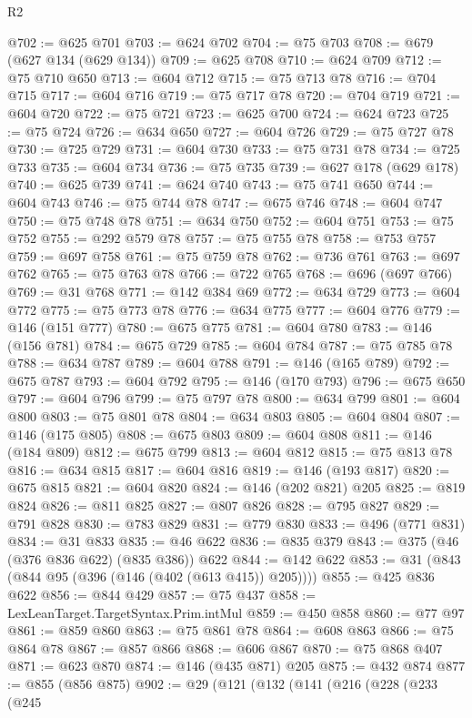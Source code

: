 \begin{lexlean}{R2}
\begin{coremodule}
@702 := @625 @701
@703 := @624 @702
@704 := @75 @703
@708 := @679 (@627 @134 (@629 @134))
@709 := @625 @708
@710 := @624 @709
@712 := @75 @710 @650
@713 := @604 @712
@715 := @75 @713 @78
@716 := @704 @715
@717 := @604 @716
@719 := @75 @717 @78
@720 := @704 @719
@721 := @604 @720
@722 := @75 @721
@723 := @625 @700
@724 := @624 @723
@725 := @75 @724
@726 := @634 @650
@727 := @604 @726
@729 := @75 @727 @78
@730 := @725 @729
@731 := @604 @730
@733 := @75 @731 @78
@734 := @725 @733
@735 := @604 @734
@736 := @75 @735
@739 := @627 @178 (@629 @178)
@740 := @625 @739
@741 := @624 @740
@743 := @75 @741 @650
@744 := @604 @743
@746 := @75 @744 @78
@747 := @675 @746
@748 := @604 @747
@750 := @75 @748 @78
@751 := @634 @750
@752 := @604 @751
@753 := @75 @752
@755 := @292 @579 @78
@757 := @75 @755 @78
@758 := @753 @757
@759 := @697 @758
@761 := @75 @759 @78
@762 := @736 @761
@763 := @697 @762
@765 := @75 @763 @78
@766 := @722 @765
@768 := @696 (@697 @766)
@769 := @31 @768
@771 := @142 @384 @69
@772 := @634 @729
@773 := @604 @772
@775 := @75 @773 @78
@776 := @634 @775
@777 := @604 @776
@779 := @146 (@151 @777)
@780 := @675 @775
@781 := @604 @780
@783 := @146 (@156 @781)
@784 := @675 @729
@785 := @604 @784
@787 := @75 @785 @78
@788 := @634 @787
@789 := @604 @788
@791 := @146 (@165 @789)
@792 := @675 @787
@793 := @604 @792
@795 := @146 (@170 @793)
@796 := @675 @650
@797 := @604 @796
@799 := @75 @797 @78
@800 := @634 @799
@801 := @604 @800
@803 := @75 @801 @78
@804 := @634 @803
@805 := @604 @804
@807 := @146 (@175 @805)
@808 := @675 @803
@809 := @604 @808
@811 := @146 (@184 @809)
@812 := @675 @799
@813 := @604 @812
@815 := @75 @813 @78
@816 := @634 @815
@817 := @604 @816
@819 := @146 (@193 @817)
@820 := @675 @815
@821 := @604 @820
@824 := @146 (@202 @821) @205
@825 := @819 @824
@826 := @811 @825
@827 := @807 @826
@828 := @795 @827
@829 := @791 @828
@830 := @783 @829
@831 := @779 @830
@833 := @496 (@771 @831)
@834 := @31 @833
@835 := @46 @622
@836 := @835 @379
@843 := @375 (@46 (@376 @836 @622) (@835 @386)) @622
@844 := @142 @622
@853 := @31 (@843 (@844 @95 (@396 (@146 (@402 (@613 @415)) @205))))
@855 := @425 @836 @622
@856 := @844 @429
@857 := @75 @437
@858 := LexLeanTarget.TargetSyntax.Prim.intMul
@859 := @450 @858
@860 := @77 @97
@861 := @859 @860
@863 := @75 @861 @78
@864 := @608 @863
@866 := @75 @864 @78
@867 := @857 @866
@868 := @606 @867
@870 := @75 @868 @407
@871 := @623 @870
@874 := @146 (@435 @871) @205
@875 := @432 @874
@877 := @855 (@856 @875)
@902 := @29
    (@121
      (@132
        (@141
          (@216
            (@228
              (@233
                (@245

\end{coremodule}
\end{lexlean}
